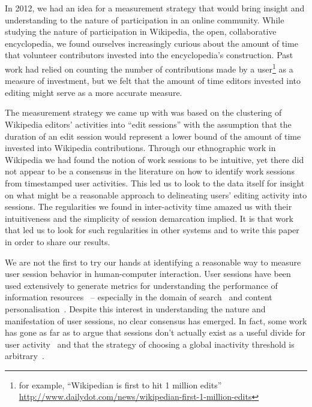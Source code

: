 In 2012, we had an idea for a measurement strategy that would bring insight and understanding to the nature of participation in an online community.  While studying the nature of participation in Wikipedia, the open, collaborative encyclopedia, we found ourselves increasingly curious about the amount of time that volunteer contributors invested into the encyclopedia's construction.  Past work had relied on counting the number of contributions made by a user\footnote{for example, ``Wikipedian is first to hit 1 million edits'' \url{http://www.dailydot.com/news/wikipedian-first-1-million-edits}} as a measure of investment, but we felt that the amount of time editors invested into editing might serve as a more accurate measure.

The measurement strategy we came up with was based on the clustering of Wikipedia editors' activities into ``edit sessions'' with the assumption that the duration of an edit session would represent a lower bound of the amount of time invested into Wikipedia contributions\cite{geiger2013using}.  Through our ethnographic work in Wikipedia we had found the notion of work sessions to be intuitive, yet there did not appear to be a consensus in the literature on how to identify work sessions from timestamped user activities.  This led us to look to the data itself for insight on what might be a reasonable approach to delineating users' editing activity into sessions. The regularities we found in inter-activity time amazed us with their intuitiveness and the simplicity of session demarcation implied. It is that work that led us to look for such regularities in other systems and to write this paper in order to share our results.

We are not the first to try our hands at identifying a reasonable way to measure user session behavior in human-computer interaction.  User sessions have been used extensively to generate metrics for understanding the performance of information resources~\cite{govseva2006empirical} -- especially in the domain of search~\cite{donato2010you,eickhoff2014lessons} and content personalisation~\cite{gomory1999analysis,spiliopoulou2003framework}. Despite this interest in understanding the nature and manifestation of user sessions, no clear consensus has emerged.  In fact, some work has gone as far as to argue that sessions don't actually exist as a useful divide for user activity~\cite{jones2008beyond} and that the strategy of choosing a global inactivity threshold is arbitrary~\cite{montgomery2001identifying}.

